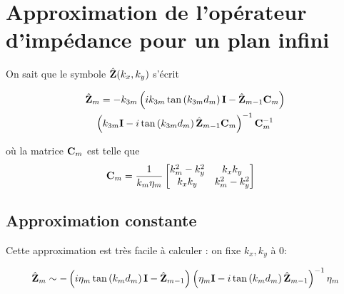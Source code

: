 \section{Approximation de l'opérateur d'impédance pour un plan infini}

    On sait que le symbole \(\hat{\mathbf{Z}}(k_x,k_y)\) s'écrit

    \begin{multline}
        \hat {\mathbf{Z}}_m = -k_{3m}
        \left(ik_{3m}\tan\left(k_{3m}d_m\right)\mathbf{I} - \hat {\mathbf{Z}}_{m-1}\mathbf{C}_m\right) \\
        \left(k_{3m}\mathbf{I} - i\tan\left(k_{3m}d_m\right)\hat {\mathbf{Z}}_{m-1}\mathbf{C}_m\right)^{-1}
        \mathbf{C}_m^{-1}
    \end{multline}

    où la matrice \(\mathbf{C}_m\) est telle que
    \begin{align}
       \mathbf{C}_m &= \dfrac{1}{k_m\eta_m}
        \begin{bmatrix}
            k_m^2 - k_y^2 & k_xk_y\\
            k_xk_y & k_m^2 - k_y^2
        \end{bmatrix}
    \end{align}

    \subsection{Approximation constante}

    Cette approximation est très facile à calculer : on fixe \(k_x,k_y\) à $0$:

    \begin{equation}
        \hat {\mathbf{Z}}_m \sim -
        \left(i\eta_m\tan\left(k_{m}d_m\right)\mathbf{I} - \hat {\mathbf{Z}}_{m-1}\right)
        \left(\eta_m\mathbf{I} - i\tan\left(k_{m}d_m\right)\hat {\mathbf{Z}}_{m-1}\right)^{-1}
        \eta_m
    \end{equation}